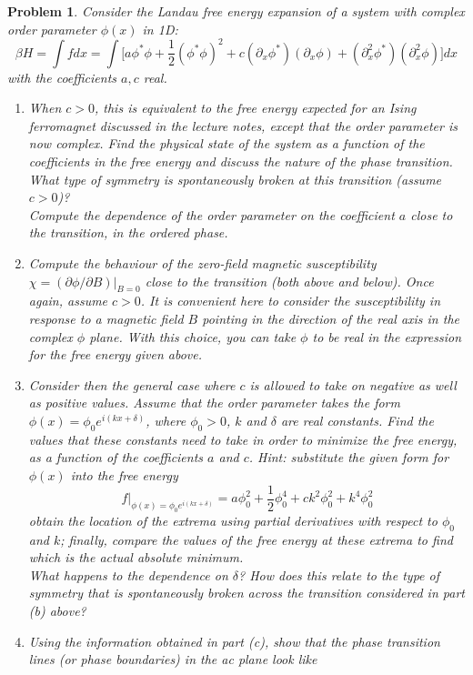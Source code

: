 \documentclass[a4paper]{article}
\theoremstyle{new}
\newtheorem{qns}{Problem}[section]
\begin{document}
\begin{qns}
Consider the Landau free energy expansion of a system with complex order parameter $\phi(x)$ in 1D:
$$\beta H=\int fdx=\int\bigg[a\phi^*\phi+\frac{1}{2}(\phi^*\phi)^2+c(\partial_x\phi^*)(\partial_x\phi)+(\partial_x^2\phi^*)(\partial_x^2\phi)\bigg]dx$$
with the coefficients $a,c$ real.
\begin{enumerate}[label=(\alph*)]
\item When $c > 0$, this is equivalent to the free energy expected for an Ising ferromagnet discussed in the lecture notes, except that the order parameter is now complex. Find the physical state of the system as a function of the coefficients in the free energy and discuss the nature of the phase transition.\\[5pt]
What type of symmetry is spontaneously broken at this transition (assume $c > 0$)?\\[5pt]
Compute the dependence of the order parameter on the coefficient $a$ close to the transition, in the ordered phase.
\item Compute the behaviour of the zero-field magnetic susceptibility $\chi = (\partial\phi/\partial B)|_{B=0}$ close to the transition (both above and below). Once again, assume $c > 0$. It is convenient here to consider the susceptibility in response to a magnetic field $B$ pointing in the direction of the real axis in the complex $\phi$ plane. With this choice, you can take $\phi$ to be real in the expression for the free energy given above.
\item Consider then the general case where $c$ is allowed to take on negative as well as positive values. Assume that the order parameter takes the form $\phi(x)=\phi_0e^{i(kx+\delta)}$, where $\phi_0>0$, $k$ and $\delta$ are real constants. Find the values that these constants need to take in order to minimize the free energy, as a function of the coefficients $a$ and $c$. Hint: substitute the given form for $\phi(x)$ into the free energy
$$f|_{\phi(x)=\phi_0e^{i(kx+\delta)}}=a\phi_0^2+\frac{1}{2}\phi_0^4+ck^2\phi_0^2+k^4\phi_0^2$$ 
obtain the location of the extrema using partial derivatives with respect to $\phi_0$ and $k$; finally, compare the values of the free energy at these extrema to find which is the actual absolute minimum.\\[5pt]
What happens to the dependence on $\delta$? How does this relate to the type of symmetry that is spontaneously broken across the transition considered in part (b) above?
\item Using the information obtained in part (c), show that the phase transition lines (or phase boundaries) in the ac plane look like

\end{enumerate}
\end{qns}
\end{document}
